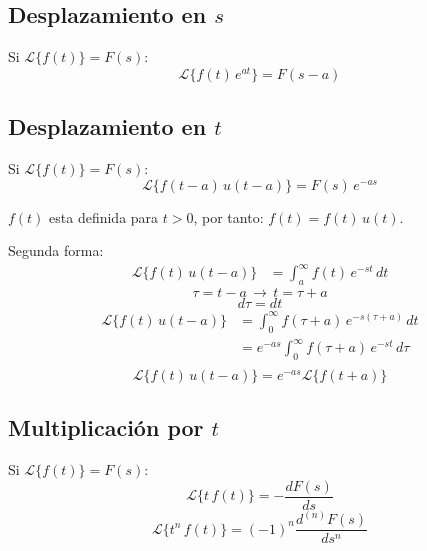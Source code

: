 \subsection{Desplazamiento en $s$}
Si $\mathcal{L}\{f(t)\}=F(s)$:
\begin{equation}
    \mathcal{L}\{f(t)\,e^{at}\}=F(s-a)
\end{equation}

\subsection{Desplazamiento en $t$}
Si $\mathcal{L}\{f(t)\}=F(s)$:
\begin{equation}
    \mathcal{L}\{f(t-a)\,u(t-a)\}=F(s)\,e^{-as}
\end{equation}

$f(t)$ esta definida para $t>0$, por tanto: $f(t)=f(t)\,u(t)$.

Segunda forma:
\begin{equation*}
\begin{split}
    \mathcal{L}\{f(t)\,u(t-a)\}
        &=\int_a^{\infty}f(t)\,e^{-st}\,dt
\end{split}
\end{equation*}
\begin{equation*}
    \tau=t-a\,\rightarrow\,t=\tau+a
\end{equation*}
\begin{equation*}
    d\tau=dt
\end{equation*}
\begin{equation*}
\begin{split}
    \mathcal{L}\{f(t)\,u(t-a)\}
        &=\int_0^{\infty}f(\tau+a)\,e^{-s(\tau+a)}\,dt\\
        &=e^{-as}\int_0^{\infty}f(\tau+a)\,e^{-st}\,d\tau\\
\end{split}
\end{equation*}
\begin{equation}
    \mathcal{L}\{f(t)\,u(t-a)\}=e^{-as}\mathcal{L}\{f(t+a)\}
\end{equation}

\subsection{Multiplicación por $t$}
Si $\mathcal{L}\{f(t)\}=F(s)$:
\begin{equation}
    \mathcal{L}\{t\,f(t)\}=-\frac{dF(s)}{ds}
\end{equation}
\begin{equation}
    \mathcal{L}\{t^n\,f(t)\}={(-1)}^n\frac{d^{(n)}F(s)}{ds^n}
\end{equation}

